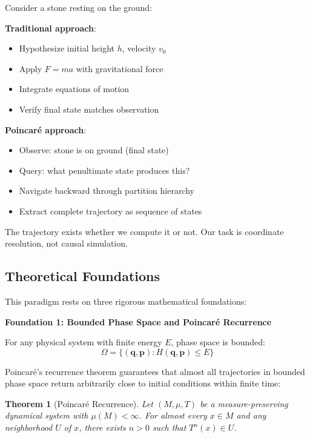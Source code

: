 \documentclass[twocolumn,10pt]{article}
\newtheorem{theorem}{Theorem}
\begin{document}
Consider a stone resting on the ground:

\textbf{Traditional approach}:
\begin{itemize}
\item Hypothesize initial height $h$, velocity $v_0$
\item Apply $F = ma$ with gravitational force
\item Integrate equations of motion
\item Verify final state matches observation
\end{itemize}

\textbf{Poincaré approach}:
\begin{itemize}
\item Observe: stone is on ground (final state)
\item Query: what penultimate state produces this?
\item Navigate backward through partition hierarchy
\item Extract complete trajectory as sequence of states
\end{itemize}

The trajectory exists whether we compute it or not. Our task is coordinate resolution, not causal simulation.

\subsection{Theoretical Foundations}

This paradigm rests on three rigorous mathematical foundations:

\textbf{Foundation 1: Bounded Phase Space and Poincaré Recurrence}

For any physical system with finite energy $E$, phase space is bounded:
\begin{equation}
\Omega = \{(\mathbf{q}, \mathbf{p}) : H(\mathbf{q}, \mathbf{p}) \leq E\}
\end{equation}

Poincaré's recurrence theorem \cite{Poincare1890} guarantees that almost all trajectories in bounded phase space return arbitrarily close to initial conditions within finite time:

\begin{theorem}[Poincaré Recurrence]
Let $(M, \mu, T)$ be a measure-preserving dynamical system with $\mu(M) < \infty$. For almost every $x \in M$ and any neighborhood $U$ of $x$, there exists $n > 0$ such that $T^n(x) \in U$.
\end{theorem}
\end{document}

